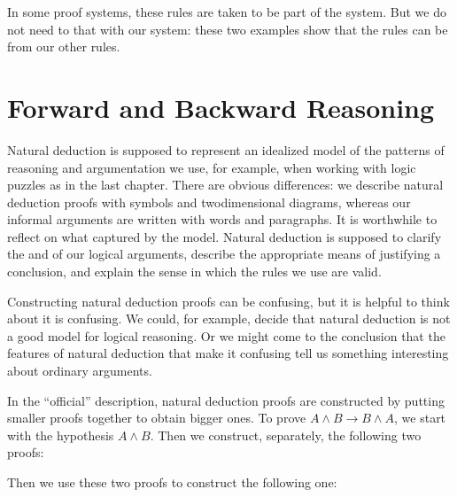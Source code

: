 \documentclass[letterpaper,10pt,english]{sphinxmanual}
\begin{document}
\sphinxAtStartPar
In some proof systems, these rules are taken to be part of the system. But we do not need to that with our system: these two examples show that the rules can be  from our other rules.


\section{Forward and Backward Reasoning}
\label{\detokenize{natural_deduction_for_propositional_logic:forward-and-backward-reasoning}}\label{\detokenize{natural_deduction_for_propositional_logic:id2}}
\sphinxAtStartPar
Natural deduction is supposed to represent an idealized model of the patterns of reasoning and argumentation we use, for example, when working with logic puzzles as in the last chapter. There are obvious differences: we describe natural deduction proofs with symbols and two\sphinxhyphen{}dimensional diagrams, whereas our informal arguments are written with words and paragraphs. It is worthwhile to reflect on what  captured by the model. Natural deduction is supposed to clarify the  and  of our logical arguments, describe the appropriate means of justifying a conclusion, and explain the sense in which the rules we use are valid.

\sphinxAtStartPar
Constructing natural deduction proofs can be confusing, but it is helpful to think about  it is confusing. We could, for example, decide that natural deduction is not a good model for logical reasoning. Or we might come to the conclusion that the features of natural deduction that make it confusing tell us something interesting about ordinary arguments.

\sphinxAtStartPar
In the “official” description, natural deduction proofs are constructed by putting smaller proofs together to obtain bigger ones. To prove \(A \wedge B \to B \wedge A\), we start with the hypothesis \(A \wedge B\). Then we construct, separately, the following two proofs:



\begin{center}
\DP
\quad\quad
{}
\DP
\end{center}

\sphinxAtStartPar
Then we use these two proofs to construct the following one:
\end{document}
